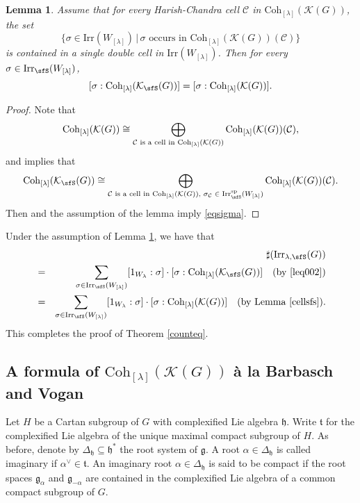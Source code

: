 \documentclass[12pt,a4paper]{amsart}
\def\subset{\subseteq}
\newcommand{\CC}{{\mathcal {C}}}
\newcommand{\CK}{{\mathcal {K}}}
\newcommand{\g}{\mathfrak g}
\newcommand{\h}{\mathfrak h}
\renewcommand{\t}{\mathfrak t}
\newcommand{\be}{\begin {equation}}
\newcommand{\ee}{\end {equation}}
\numberwithin{equation}{section}
\newtheorem{lem}[thm]{Lemma}
\theoremstyle{remark}
\def\Irr{\mathrm{Irr}}
\def\Coh{\mathrm{Coh}}
\newcommand{\Lam}{{[\lambda]}}
\begin{document}
\begin{lem}\label{cellsfs}
Assume that for every Harish-Chandra cell $\CC$ in $\Coh_{\Lam}(\CK(G))$, the set
\[
\{\sigma\in \Irr(W_{[\lambda]})\,|\, \textrm{$\sigma$ occurs in $\Coh_{\Lam}(\CK(G))(\CC)$}\}
\]
is contained in a single double cell in $\Irr(W_\Lam)$. Then for every $\sigma\in \Irr_\sfS(W_\Lam)$,
\be\label{eqsigma}
[ \sigma: \Coh_{\Lam}(\CK_\sfS(G))]=[\sigma:\Coh_{\Lam}(\CK(G))].
\ee
\end{lem}
\begin{proof}
Note that
\[
  \Coh_{\Lam}(\CK(G))\\
   \cong \bigoplus_{\CC \textrm{ is a cell in $\Coh_{\Lam}(\CK(G))$}} \Coh_{\Lam}(\CK(G))(\CC),
\]
and
 implies that
 \[
   \Coh_{\Lam}(\CK_\sfS(G))\cong  \bigoplus_{\CC \textrm{ is a cell in $\Coh_{\Lam}(\CK(G))$, $\sigma_\CC\in \Irr^{\mathrm{sp}}_\sfS(W_\Lam)$}} \Coh_{\Lam}(\CK(G))(\CC).
 \]
Then   and the assumption of the lemma imply \eqref{eqsigma}. \end{proof}

Under the assumption of Lemma \ref{cellsfs}, we have that
\begin{eqnarray*}
   && \sharp(\Irr_{\lambda,\sfS}(G)) \\
   &=&  \sum_{\sigma \in \Irr_\sfS(W_\Lam)} [1_{W_{\lambda}}: \sigma]\cdot [\sigma:\Coh_{\Lam}(\CK_\sfS(G))]   \quad (\textrm{by \eqref{leq002}})\\
    &= & \sum_{\sigma \in \Irr_\sfS(W_\Lam)} [1_{W_{\lambda}}: \sigma]\cdot [\sigma:\Coh_{\Lam}(\CK(G))]   \quad (\textrm{by Lemma \ref{cellsfs}}).\\
\end{eqnarray*}
This completes the proof of Theorem \ref{counteq}.



\subsection{A formula of $\Coh_{\Lam}(\CK(G))$ \`a la Barbasch and Vogan}

 Let $H$ be a  Cartan subgroup of $G$ with complexified Lie algebra $\h$. Write $\t$ for the complexified Lie algebra of the unique maximal compact subgroup of $H$. As before, denote by $\Delta_\h\subset \h^*$ the root system of $\g$. A root $\alpha\in \Delta_\h$ is called imaginary if $\alpha^\vee\in \t$. An imaginary root $\alpha\in \Delta_\h$ is said to be compact if the root spaces $\g_\alpha$ and $\g_{-\alpha}$ are contained in  the  complexified Lie algebra of a common compact subgroup of $G$.
\end{document}
